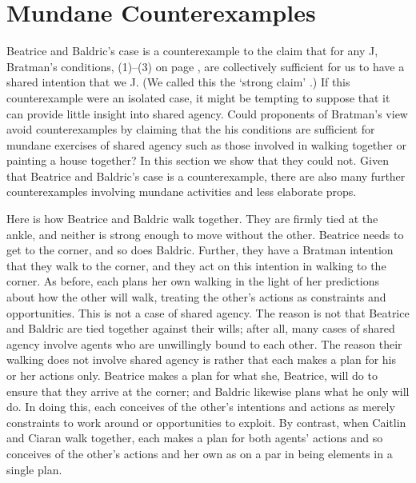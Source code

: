 \documentclass[12pt,\papersize]{extarticle}
\begin{document}
\section{Mundane Counterexamples}
Beatrice and Baldric's case is a counterexample to the claim that for any J, Bratman's conditions, (1)--(3) on page \pageref{quote:bratman_account}, are collectively sufficient for us to have a shared intention that we J.
(We called this the `strong claim'  .)
If this counterexample were an isolated case, it might be tempting to suppose that it can provide little insight into shared agency.
Could proponents of Bratman's view avoid counterexamples by claiming that the his conditions are sufficient for mundane exercises of shared agency such as those involved in walking together or painting a house together?
In this section we show that they could not.
Given that Beatrice and Baldric's case is a counterexample,
there are also many further counterexamples involving mundane activities and less elaborate props.

Here is how Beatrice and Baldric walk together.
They are firmly tied at the ankle, and neither is strong enough to move without the other.
Beatrice needs to get to the corner, and so does Baldric.
Further, they have a Bratman intention that they walk to the corner, and they act on this intention in walking to the corner.
As before, each plans her own walking in the light of her predictions about how the other will walk, treating the other's actions as constraints and opportunities.
This is not a case of shared agency.
The reason is not that Beatrice and Baldric are tied together against their wills; 
after all, many cases of shared agency involve agents who are unwillingly bound to each other.
The reason their walking does not involve shared agency 
is rather that each
makes a plan for his or her actions only.
Beatrice makes a plan for what she, Beatrice, will do to ensure that they arrive at the corner; and Baldric likewise plans what he only will do.
In doing this, each conceives of the other's intentions and actions as merely constraints to work around or opportunities to exploit.
By contrast,
when Caitlin and Ciaran walk together, each makes a plan for both agents' actions and so conceives of the other's actions and her own as on a par in being elements in a single plan.
\end{document}
